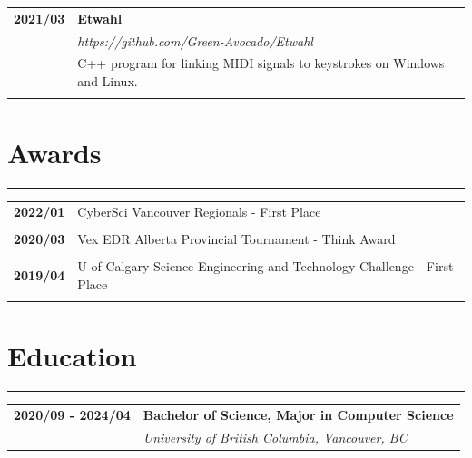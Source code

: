 \documentclass[letterpaper]{article}
\newcommand{\sect}[1]{\section*{#1}
                        {\color{cyan}
                        \rule{\textwidth}{1pt}
                        \vspace{-1ex}}}
\begin{document}
        \begin{tabular}{p{} p{}} 
            \textbf{2021/03} & \large\textbf{Etwahl} \\
            & \emph{https://github.com/Green-Avocado/Etwahl} \\
            & C++ program for linking MIDI signals to keystrokes on Windows and Linux. \\
            \\
        \end{tabular}

    \sect{Awards}

        \begin{tabular}{p{} p{}} 
            \textbf{2022/01} & CyberSci Vancouver Regionals - First Place \\
            \\
            \textbf{2020/03} & Vex EDR Alberta Provincial Tournament - Think Award \\
            \\
            \textbf{2019/04} & U of Calgary Science Engineering and Technology Challenge - First Place \\
            \\
        \end{tabular}

    \sect{Education}

        \begin{tabular}{p{} p{}} 
            \textbf{2020/09 - 2024/04} & \large\textbf{Bachelor of Science, Major in Computer Science} \\
            & \emph{University of British Columbia, Vancouver, BC} \\
        \end{tabular}
\end{document}
